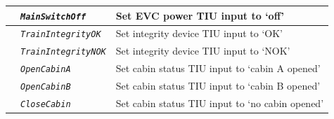 \begin{itemize}
\begin{longtable}{|l|l|l|}
			\hline

			&	\begin{minipage}[t]{0.30\linewidth} \emph{\texttt{MainSwitchOff}} \end{minipage}
			&	\begin{minipage}[t]{0.38\linewidth} Set EVC power TIU input to ‘off’\end{minipage} \\

			\hline

			&	\begin{minipage}[t]{0.30\linewidth} \emph{\texttt{TrainIntegrityOK}} \end{minipage}
			&	\begin{minipage}[t]{0.38\linewidth} Set integrity device TIU input to ‘OK’ \end{minipage}\\

			\hline

			&	\begin{minipage}[t]{0.30\linewidth} \emph{\texttt{TrainIntegrityNOK}} \end{minipage}
			&	\begin{minipage}[t]{0.38\linewidth} Set integrity device TIU input to ‘NOK’ \end{minipage} \\

			\hline

			&	\begin{minipage}[t]{0.30\linewidth} \emph{\texttt{OpenCabinA}} \end{minipage}
			&	\begin{minipage}[t]{0.38\linewidth} Set cabin status TIU input to ‘cabin A opened’ \end{minipage} \\

			\hline

			&	\begin{minipage}[t]{0.30\linewidth} \emph{\texttt{OpenCabinB}} \end{minipage}
			&	\begin{minipage}[t]{0.38\linewidth} Set cabin status TIU input to ‘cabin B opened’ \end{minipage} \\

			\hline

			&	\begin{minipage}[t]{0.30\linewidth} \emph{\texttt{CloseCabin}} \end{minipage}
			&	\begin{minipage}[t]{0.38\linewidth} Set cabin status TIU input to ‘no cabin opened’ \end{minipage} \\


\end{longtable}
\end{itemize}
